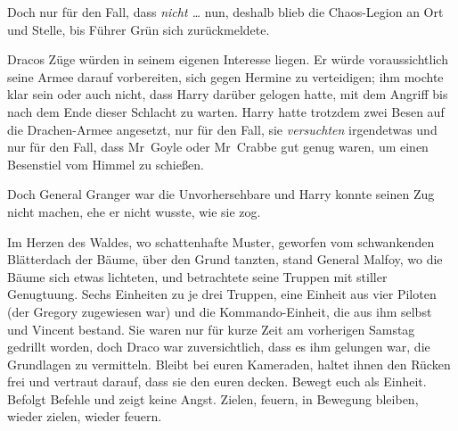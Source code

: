 Doch nur für den Fall, dass \emph{nicht …} nun, deshalb blieb die Chaos-Legion an Ort und Stelle, bis Führer Grün sich zurückmeldete.

Dracos Züge würden in seinem eigenen Interesse liegen. Er würde voraussichtlich seine Armee darauf vorbereiten, sich gegen Hermine zu verteidigen; ihm mochte klar sein oder auch nicht, dass Harry darüber gelogen hatte, mit dem Angriff bis nach dem Ende dieser Schlacht zu warten. Harry hatte trotzdem zwei Besen auf die Drachen-Armee angesetzt, nur für den Fall, sie \emph{versuchten} irgendetwas und nur für den Fall, dass Mr~Goyle oder Mr~Crabbe gut genug waren, um einen Besenstiel vom Himmel zu schießen.

Doch General Granger war die Unvorhersehbare und Harry konnte seinen Zug nicht machen, ehe er nicht wusste, wie sie zog.

\later

Im Herzen des Waldes, wo schattenhafte Muster, geworfen vom schwankenden Blätterdach der Bäume, über den Grund tanzten, stand General Malfoy, wo die Bäume sich etwas lichteten, und betrachtete seine Truppen mit stiller Genugtuung. Sechs Einheiten zu je drei Truppen, eine Einheit aus vier Piloten (der Gregory zugewiesen war) und die Kommando-Einheit, die aus ihm selbst und Vincent bestand. Sie waren nur für kurze Zeit am vorherigen Samstag gedrillt worden, doch Draco war zuversichtlich, dass es ihm gelungen war, die Grundlagen zu vermitteln. Bleibt bei euren Kameraden, haltet ihnen den Rücken frei und vertraut darauf, dass sie den euren decken. Bewegt euch als Einheit. Befolgt Befehle und zeigt keine Angst. Zielen, feuern, in Bewegung bleiben, wieder zielen, wieder feuern.

